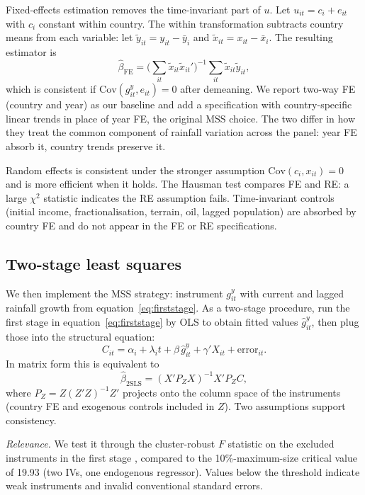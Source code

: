 \documentclass[11pt,a4paper]{article}
\begin{document}
Fixed-effects estimation removes the time-invariant part of $u$. Let
$u_{it} = c_i + e_{it}$ with $c_i$ constant within country. The within
transformation subtracts country means from each variable: let
$\tilde y_{it} = y_{it} - \bar y_i$ and $\tilde x_{it} = x_{it} - \bar
x_i$. The resulting estimator is
\[
\hat\beta_{\text{FE}}
   = \Big( \textstyle\sum_{it} \tilde x_{it} \tilde x_{it}' \Big)^{-1}
     \textstyle\sum_{it} \tilde x_{it} \tilde y_{it},
\]
which is consistent if $\mathrm{Cov}(g^{y}_{it}, e_{it}) = 0$ after
demeaning. We report two-way FE (country and year) as our baseline and
add a specification with country-specific linear trends in place of
year FE, the original MSS choice. The two differ in how they treat the
common component of rainfall variation across the panel: year FE
absorb it, country trends preserve it.

Random effects is consistent under the stronger assumption
$\mathrm{Cov}(c_i, x_{it}) = 0$ and is more efficient when it holds.
The Hausman test compares FE and RE: a large $\chi^2$ statistic
indicates the RE assumption fails. Time-invariant controls (initial
income, fractionalisation, terrain, oil, lagged population) are
absorbed by country FE and do not appear in the FE or RE
specifications.

\subsection{Two-stage least squares}\label{sec:2sls}

We then implement the MSS strategy: instrument $g^{y}_{it}$ with
current and lagged rainfall growth from equation~\eqref{eq:firststage}.
As a two-stage procedure, run the first stage in
equation~\eqref{eq:firststage} by OLS to obtain fitted values
$\hat g^{y}_{it}$, then plug those into the structural equation:
\[
C_{it} = \alpha_i + \lambda_i t + \beta\, \hat g^{y}_{it}
       + \gamma' X_{it} + \text{error}_{it}.
\]
In matrix form this is equivalent to
\[
\hat\beta_{\text{2SLS}} = (X' P_Z X)^{-1} X' P_Z C,
\]
where $P_Z = Z(Z'Z)^{-1} Z'$ projects onto the column space of the
instruments (country FE and exogenous controls included in $Z$). Two
assumptions support consistency.

\textit{Relevance.} We test it through the cluster-robust $F$ statistic
on the excluded instruments in the first stage \citep{StaigerStock1997},
compared to the \citet{StockYogo2005} 10\%-maximum-size critical value
of 19.93 (two IVs, one endogenous regressor). Values below the
threshold indicate weak instruments and invalid conventional standard
errors.
\end{document}
